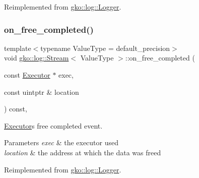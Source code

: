 Reimplemented from \hyperlink{classgko_1_1log_1_1Logger}{gko\+::log\+::\+Logger}.

\mbox{\label{classgko_1_1log_1_1Stream_a0b0db1ea986997ac064767656cc22c23}} 
\subsubsection{\texorpdfstring{on\+\_\+free\+\_\+completed()}{on\_free\_completed()}}
{\footnotesize\ttfamily template$<$typename Value\+Type  = default\+\_\+precision$>$ \\
void \hyperlink{classgko_1_1log_1_1Stream}{gko\+::log\+::\+Stream}$<$ Value\+Type $>$\+::on\+\_\+free\+\_\+completed (\begin{DoxyParamCaption}\item[{const \hyperlink{classgko_1_1Executor}{Executor} $\ast$}]{exec,  }\item[{const uintptr \&}]{location }\end{DoxyParamCaption}) const\hspace{0.3cm}{\ttfamily [override]}, {\ttfamily [virtual]}}



\hyperlink{classgko_1_1Executor}{Executor}\textquotesingle{}s free completed event. 


\begin{DoxyParams}{Parameters}
{\em exec} & the executor used \\
\hline
{\em location} & the address at which the data was freed \\
\hline
\end{DoxyParams}


Reimplemented from \hyperlink{classgko_1_1log_1_1Logger}{gko\+::log\+::\+Logger}.

\mbox{\label{classgko_1_1log_1_1Stream_a04e460838f9c3ba72dee32b545d2caa2}} 

